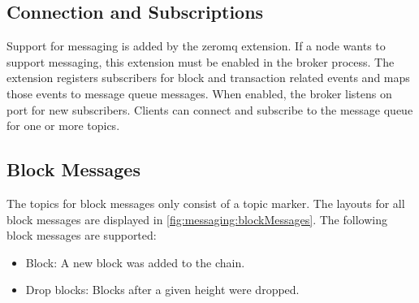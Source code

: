 \subsection{Connection and Subscriptions}
\label{sec:messaging:messages}

Support for messaging is added by the zeromq extension.
If a node wants to support messaging, this extension must be enabled in the broker process.
The extension registers subscribers for block and transaction related events  and maps those events to message queue messages.
When enabled, the broker listens on port  for new subscribers.
Clients can connect and subscribe to the message queue for one or more topics.

\subsection{Block Messages}

The topics for block messages only consist of a topic marker.
The layouts for all block messages are displayed in \autoref{fig:messaging:blockMessages}.
The following block messages are supported:

\begin{itemize}
	\item{Block: A new block was added to the chain.}
	\item{Drop blocks: Blocks after a given height were dropped.}
\end{itemize}

\begin{figure}[H]
	\label{fig:messaging:blockMessages}
\end{figure}

